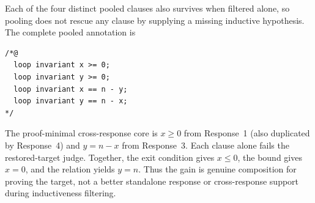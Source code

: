 \noindent\begin{minipage}{\textwidth}
Each of the four distinct pooled clauses also survives when filtered alone,
so pooling does not rescue any clause by supplying a missing inductive
hypothesis.  The complete pooled annotation is
\begin{lstlisting}
/*@
  loop invariant x >= 0;
  loop invariant y >= 0;
  loop invariant x == n - y;
  loop invariant y == n - x;
*/
\end{lstlisting}
The proof-minimal cross-response core is \(x\geq0\) from Response~1 (also
duplicated by Response~4) and \(y=n-x\) from Response~3.  Each clause alone
fails the restored-target judge.  Together, the exit condition gives
\(x\leq0\), the bound gives \(x=0\), and the relation yields \(y=n\).
Thus the gain is genuine composition for proving the target, not a better
standalone response or cross-response support during inductiveness filtering.
\end{minipage}

